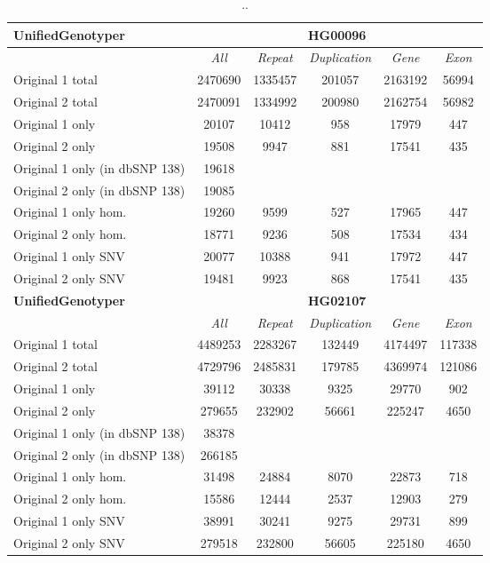 \begin{table}[htb]
\caption{ .. }
\begin{center}
\begin{tabular}{|l|c||c|c|c|c|}
\hline
{\bf UnifiedGenotyper} & \multicolumn{5}{|c|}{\bf HG00096} \\
\hline
\cline{2-6}
{\bf} & {\it All} & {\it Repeat} & {\it Duplication} & {\it Gene} & {\it Exon} \\
\hline
Original 1 total & 2470690 & 1335457 & 201057 & 2163192 & 56994\\ 
\hline
Original 2 total & 2470091 & 1334992 & 200980 & 2162754 & 56982\\ 
\hline
Original 1 only & 20107 & 10412 & 958 & 17979 & 447\\ 
\hline
Original 2 only & 19508 & 9947 & 881 & 17541 & 435\\ 
\hline
Original 1 only (in dbSNP 138) & 19618 &  &  &  & \\ 
\hline
Original 2 only (in dbSNP 138) & 19085 &  &  &  & \\ 
\hline
Original 1 only hom. & 19260 & 9599 & 527 & 17965 & 447\\ 
\hline
Original 2 only hom. & 18771 & 9236 & 508 & 17534 & 434\\ 
\hline
Original 1 only SNV & 20077 & 10388 & 941 & 17972 & 447\\ 
\hline
Original 2 only SNV & 19481 & 9923 & 868 & 17541 & 435\\ 
\hline
\hline
{\bf UnifiedGenotyper} & \multicolumn{5}{|c|}{\bf HG02107} \\
\hline
\cline{2-6}
{\bf} & {\it All} & {\it Repeat} & {\it Duplication} & {\it Gene} & {\it Exon} \\
\hline
Original 1 total & 4489253 & 2283267 & 132449 & 4174497 & 117338\\ 
\hline
Original 2 total & 4729796 & 2485831 & 179785 & 4369974 & 121086\\ 
\hline
Original 1 only & 39112 & 30338 & 9325 & 29770 & 902\\ 
\hline
Original 2 only & 279655 & 232902 & 56661 & 225247 & 4650\\ 
\hline
Original 1 only (in dbSNP 138) & 38378 &  &  &  & \\ 
\hline
Original 2 only (in dbSNP 138) & 266185 &  &  &  & \\ 
\hline
Original 1 only hom. & 31498 & 24884 & 8070 & 22873 & 718\\ 
\hline
Original 2 only hom. & 15586 & 12444 & 2537 & 12903 & 279\\ 
\hline
Original 1 only SNV & 38991 & 30241 & 9275 & 29731 & 899\\ 
\hline
Original 2 only SNV & 279518 & 232800 & 56605 & 225180 & 4650\\ 
\hline
\end{tabular}
\end{center}
\label{tab:orig-vs-orig2-ug}
\end{table}

